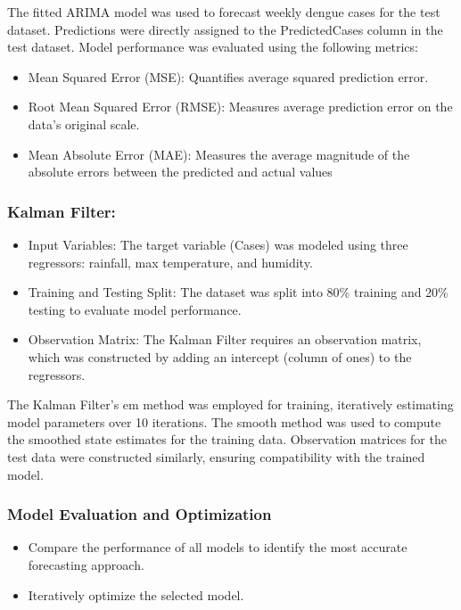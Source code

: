The fitted ARIMA model was used to forecast weekly dengue cases for the test dataset. Predictions were directly assigned to the PredictedCases column in the test dataset. Model performance was evaluated using the following metrics:
\begin{itemize}
	\item Mean Squared Error (MSE): Quantifies average squared prediction error.
	\item Root Mean Squared Error (RMSE): Measures average prediction error on the data's original scale.
	\item Mean Absolute Error (MAE): Measures the average  magnitude of the absolute errors between the predicted and actual values
\end{itemize}



\subsubsection{Kalman Filter:}
\begin{itemize}
	\item Input Variables: The target variable (Cases) was modeled using three regressors: rainfall, max temperature, and humidity.
	\item Training and Testing Split: The dataset was split into 80\% training and 20\% testing to evaluate model performance.
	\item Observation Matrix: The Kalman Filter requires an observation matrix, which was constructed by adding an intercept (column of ones) to the regressors.
\end{itemize}

The Kalman Filter's em method was employed for training, iteratively estimating model parameters over 10 iterations.
The smooth method was used to compute the smoothed state estimates for the training data.
Observation matrices for the test data were constructed similarly, ensuring compatibility with the trained model.

\subsubsection{Model Evaluation and Optimization}
\begin{itemize}
	\item Compare the performance of all models to identify the most accurate forecasting approach.
	\item Iteratively optimize the selected model.
\end{itemize}

